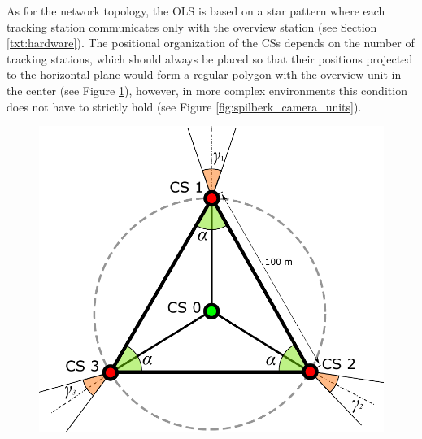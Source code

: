 As for the network topology, the OLS is based on a star pattern where each tracking station communicates only with the overview station (see Section \ref{txt:hardware}). The positional organization of the CSs depends on the number of tracking stations, which should always be placed so that their positions projected to the horizontal plane would form a regular polygon with the overview unit in the center (see Figure \ref{fig:system_overview}), however, in more complex environments this condition does not have to strictly hold (see Figure \ref{fig:spilberk_camera_units}).

\begin{figure}[htb]
	\centering
	\begin{minipage}{.45\textwidth}
		\centering
		\includegraphics[width=.99\linewidth]{fig/system_overview.pdf}
		\label{fig:system_overview}
	\end{minipage}
	\hfill
	\begin{minipage}{.48\textwidth}
		\centering

\end{minipage}
\end{figure}
